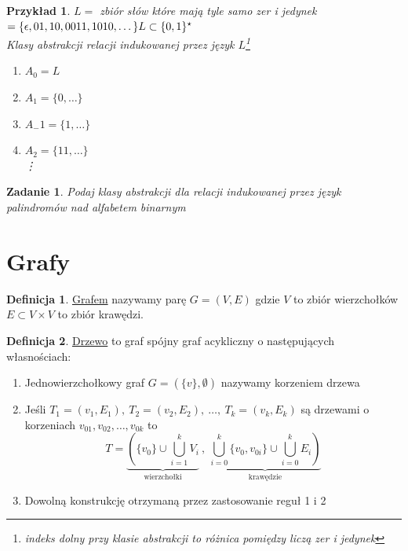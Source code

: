 \documentclass[12pt,a4paper]{article}
\newtheorem{przyklad}{Przykład}
\newtheorem{zad}{Zadanie}
\theoremstyle{definition}
\newtheorem{df}{Definicja}
\theoremstyle{remark}
\begin{document}
	\begin{przyklad}
		$L = $ zbiór słów które mają tyle samo zer i jedynek $ = \{\epsilon, 01, 10, 0011, 1010, \dots\}\\
		L \subset \{0, 1\}^\star$\\
		Klasy abstrakcji relacji indukowanej przez język $L$\footnote{indeks dolny przy klasie abstrakcji to różnica pomiędzy liczą zer i jedynek}
		\begin{enumerate}
			\item $A_0 = L$
			\item $A_1 = \{0, \dots \}$
			\item $A_-1 = \{1, \dots \}$
			\item $A_2 = \{11, \dots \}$\\
			\vdots
		\end{enumerate}
	\end{przyklad}
	\begin{zad}
		Podaj klasy abstrakcji dla relacji indukowanej przez język palindromów nad alfabetem binarnym
	\end{zad}

\section{Grafy}
	
	\begin{df}
		\href{http://pl.wikipedia.org/wiki/Graf_(matematyka)}{Grafem} nazywamy parę $G = (V, E)$ gdzie $V$ to zbiór wierzchołków 
		$E \subset V \times V$ to zbiór krawędzi.
	\end{df}	

	\begin{df}
		\href{http://pl.wikipedia.org/wiki/Drzewo_(matematyka)}{Drzewo} to graf spójny graf acykliczny o następujących własnościach:
		\begin{enumerate}
			\item Jednowierzchołkowy graf $G = (\{v\}, \emptyset)$ nazywamy korzeniem drzewa
			\item Jeśli $T_1 = (v_1, E_1), ~ T_2 = (v_2, E_2), ~\dots ,~ T_k = (v_k, E_k)$ są drzewami o korzeniach $v_{01}, v_{02}, \dots, v_{0k}$
			to $$T = \underbrace{ \left(\{v_0\} \cup \bigcup^k_{i=1}V_i \right. }_\text{wierzchołki} ~,~
					\underbrace{ \left. \bigcup_{i=0}^k \{v_0, v_{0i}\} \cup \bigcup_{i=0}^k E_i \right) }_\text{krawędzie}$$
			\item Dowolną konstrukcję otrzymaną przez zastosowanie reguł 1 i 2
		\end{enumerate}			
	\end{df}
	
\end{document}
